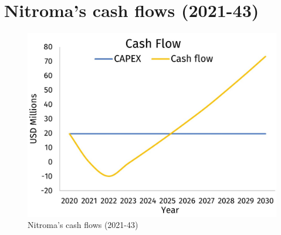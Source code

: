 \section{Nitroma's cash flows (2021-43)}
\label{app:cash-flows-econ}

\begin{figure}[h]
\centering
 \includegraphics{chapters/6-economics/figures/Cash-flow.jpg}
 \caption{Nitroma's cash flows (2021-43) }
 \label{fig:cash-flows-econ}
\end{figure}